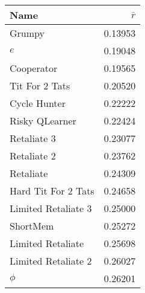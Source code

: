 \begin{tabular}{lr}
\toprule
Name                &                   $\bar{r} $    \\
\midrule
Grumpy              &                         0.13953 \\
$e$                 &                         0.19048 \\
Cooperator          &                         0.19565 \\
Tit For 2 Tats      &                         0.20520 \\
Cycle Hunter        &                         0.22222 \\
Risky QLearner      &                         0.22424 \\
Retaliate 3         &                         0.23077 \\
Retaliate 2         &                         0.23762 \\
Retaliate           &                         0.24309 \\
Hard Tit For 2 Tats &                         0.24658 \\
Limited Retaliate 3 &                         0.25000 \\
ShortMem            &                         0.25272 \\
Limited Retaliate   &                         0.25698 \\
Limited Retaliate 2 &                         0.26027 \\
$\phi$              &                         0.26201 \\
\bottomrule
\end{tabular}
